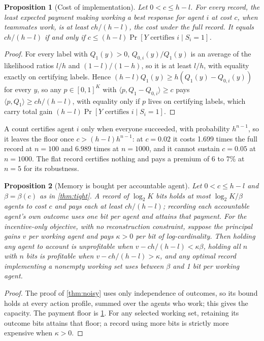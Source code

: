 \documentclass[sigconf,anonymous,acmthm=false]{aamas}
\theoremstyle{acmplain}
\newtheorem{proposition}{Proposition}
\theoremstyle{acmdefinition}
\begin{document}
\begin{proposition}[Cost of implementation]\label{prop:cost}
Let $0<c\le h-l$. For every record, the least expected payment making working a best
response for agent $i$ at cost $c$, when teammates work, is at least $ch/(h-l)$, the cost under the full record. It
equals $ch/(h-l)$ if and only if $c\le(h-l)\Pr[Y\text{ certifies }i\mid S_i=1]$.
\end{proposition}
\begin{proof}
For every label with $Q_1(y)>0$, $Q_{0,i}(y)/Q_1(y)$ is an average of the likelihood ratios $l/h$ and
$(1-l)/(1-h)$, so it is at least $l/h$, with equality exactly on certifying labels. Hence
$(h-l)Q_1(y)\ge h(Q_1(y)-Q_{0,i}(y))$ for every $y$, so any $p\in[0,1]^K$ with
$\langle p,Q_1-Q_{0,i}\rangle\ge c$ pays $\langle p,Q_1\rangle\ge ch/(h-l)$, with equality
only if $p$ lives on certifying labels, which carry total gain
$(h-l)\Pr[Y\text{ certifies }i\mid S_i=1]$.
\end{proof}

A count certifies agent $i$ only when everyone succeeded, with probability $h^{n-1}$, so it
leaves the floor once $c>(h-l)h^{n-1}$: at $c=0.02$ it costs 1.699 times the full record at
$n=100$ and 6.989 times at $n=1000$, and it cannot sustain $c=0.05$ at $n=1000$. The flat
record certifies nothing and pays a premium of 6 to 7\% at $n=5$ for its robustness.

\begin{proposition}[Memory is bought per accountable agent]\label{prop:designer}
Let $0<c\le h-l$ and $\beta=\beta(c)$ as in \cref{thm:tight}. A record of $\log_2K$
bits holds at most $\log_2K/\beta$ agents to cost $c$ and pays each at least $ch/(h-l)$;
recording each accountable agent's own outcome uses one bit per agent and attains that
payment. For the incentive-only objective, with no reconstruction constraint, suppose the principal
gains $v$ per working agent and pays $\kappa>0$ per bit of log-cardinality. Then
holding any agent to account is unprofitable when $v-ch/(h-l)<\kappa\beta$, holding all $n$
with $n$ bits is profitable when $v-ch/(h-l)>\kappa$, and any optimal record implementing a nonempty working set uses between $\beta$ and
1 bit per working agent.
\end{proposition}
\begin{proof}
The proof of \cref{thm:noisy} uses only independence of outcomes, so its bound holds at every
action profile, summed over the agents who work; this gives the capacity. The payment floor
is \cref{prop:cost}. For any selected working set, retaining its outcome bits attains
that floor; a record using more bits is strictly more expensive when $\kappa>0$.
\end{proof}
\end{document}
